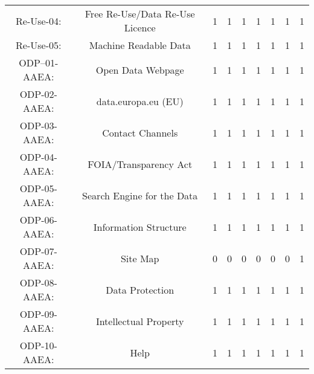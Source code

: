 \documentclass[a4paper, twoside]{report}
\begin{document}
\begin{table}[htbp]
\begin{adjustbox}{max width=\linewidth}
\begin{tabular}{rcccccccc}
    \multicolumn{1}{c}{Re-Use-04:} & \multicolumn{1}{p{19em}}{\cellcolor[rgb]{ .749,  .749,  .749}Free Re-Use/Data Re-Use Licence} & \cellcolor[rgb]{ .749,  .749,  .749}1 & \cellcolor[rgb]{ .749,  .749,  .749}1 & \cellcolor[rgb]{ .749,  .749,  .749}1 & \cellcolor[rgb]{ .749,  .749,  .749}1 & \cellcolor[rgb]{ .749,  .749,  .749}1 & \cellcolor[rgb]{ .749,  .749,  .749}1 & \cellcolor[rgb]{ .749,  .749,  .749}1 \\
    \multicolumn{1}{c}{Re-Use-05:} & \multicolumn{1}{p{19em}}{\cellcolor[rgb]{ .749,  .749,  .749}Machine Readable Data} & \cellcolor[rgb]{ .749,  .749,  .749}1 & \cellcolor[rgb]{ .749,  .749,  .749}1 & \cellcolor[rgb]{ .749,  .749,  .749}1 & \cellcolor[rgb]{ .749,  .749,  .749}1 & \cellcolor[rgb]{ .749,  .749,  .749}1 & \cellcolor[rgb]{ .749,  .749,  .749}1 & \cellcolor[rgb]{ .749,  .749,  .749}1 \\
    \midrule
    \multicolumn{1}{c}{ODP--01-AAEA:} & \multicolumn{1}{p{19em}}{Open Data Webpage} & 1     & 1     & 1     & 1     & 1     & 1     & 1 \\
    \multicolumn{1}{c}{ODP-02-AAEA:} & \multicolumn{1}{p{19em}}{data.europa.eu (EU)} & 1     & 1     & 1     & 1     & 1     & 1     & 1 \\
    \multicolumn{1}{c}{ODP-03-AAEA:} & \multicolumn{1}{p{19em}}{Contact Channels} & 1     & 1     & 1     & 1     & 1     & 1     & 1 \\
    \multicolumn{1}{c}{ODP-04-AAEA:} & \multicolumn{1}{p{19em}}{FOIA/Transparency Act} & 1     & 1     & 1     & 1     & 1     & 1     & 1 \\
    \multicolumn{1}{c}{ODP-05-AAEA:} & \multicolumn{1}{p{19em}}{Search Engine for the Data} & 1     & 1     & 1     & 1     & 1     & 1     & 1 \\
    \multicolumn{1}{c}{ODP-06-AAEA:} & \multicolumn{1}{p{19em}}{Information Structure} & 1     & 1     & 1     & 1     & 1     & 1     & 1 \\
    \multicolumn{1}{c}{ODP-07-AAEA:} & \multicolumn{1}{p{19em}}{Site Map} & 0     & 0     & 0     & 0     & 0     & 0     & 1 \\
    \multicolumn{1}{c}{ODP-08-AAEA:} & \multicolumn{1}{p{19em}}{Data Protection} & 1     & 1     & 1     & 1     & 1     & 1     & 1 \\
    \multicolumn{1}{c}{ODP-09-AAEA:} & \multicolumn{1}{p{19em}}{Intellectual Property} & 1     & 1     & 1     & 1     & 1     & 1     & 1 \\
    \multicolumn{1}{c}{ODP-10-AAEA:} & \multicolumn{1}{p{19em}}{Help} & 1     & 1     & 1     & 1     & 1     & 1     & 1 \\

\end{tabular}
\end{adjustbox}
\end{table}
\end{document}
